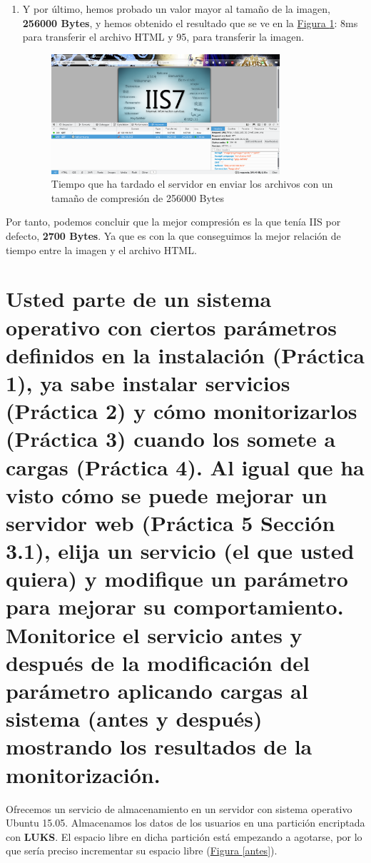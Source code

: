 \documentclass[10pt,a4paper,spanish]{article}
\numberwithin{equation}{section} %
\numberwithin{figure}{section} %
\numberwithin{table}{section} %
\begin{document}
\begin{enumerate}[$\bullet$]
    \item Y por último, hemos probado un valor mayor al tamaño de la imagen, \textbf{256000 Bytes}, y hemos obtenido el resultado que se ve en la \hyperref[compr3]{Figura \ref*{compr3}}: 8ms para transferir el archivo HTML y 95, para transferir la imagen.

        \begin{figure}[!h]
            \centering
            \includegraphics[width=0.8\textwidth]{25}
            \caption{Tiempo que ha tardado el servidor en enviar los archivos con un tamaño de compresión de 256000 Bytes}
            \label{compr3}
        \end{figure}
\end{enumerate}

Por tanto, podemos concluir que la mejor compresión es la que tenía IIS por defecto, \textbf{2700 Bytes}. Ya que es con la que conseguimos la mejor relación de tiempo entre la imagen y el archivo HTML.

\section{Usted parte de un sistema operativo con ciertos parámetros definidos en la instalación (Práctica 1), ya sabe instalar servicios (Práctica 2) y cómo monitorizarlos (Práctica 3) cuando los somete a cargas (Práctica 4). Al igual que ha visto cómo se puede mejorar un servidor web (Práctica 5 Sección 3.1), elija un servicio (el que usted quiera) y modifique un parámetro para mejorar su comportamiento. Monitorice el servicio antes y después de la modificación del parámetro aplicando cargas al sistema (antes y después) mostrando los resultados de la monitorización.}
Ofrecemos un servicio de almacenamiento en un servidor con sistema operativo Ubuntu 15.05. Almacenamos los datos de los usuarios en una partición encriptada con \textbf{LUKS}. El espacio libre en dicha partición está empezando a agotarse, por lo que sería preciso incrementar su espacio libre (\hyperref[antes]{Figura \ref*{antes}}).
\end{document}
